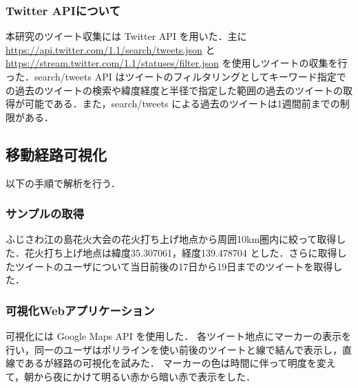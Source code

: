 \subsubsection{Twitter APIについて}
本研究のツイート収集には Twitter API を用いた．主に \url{https://api.twitter.com/1.1/search/tweets.json} と \url{https://stream.twitter.com/1.1/statuses/filter.json} を使用しツイートの収集を行った．search/tweets API はツイートのフィルタリングとしてキーワード指定での過去のツイートの検索や緯度経度と半径で指定した範囲の過去のツイートの取得が可能である．また，search/tweets による過去のツイートは1週間前までの制限がある．

\subsection{移動経路可視化}
以下の手順で解析を行う．

\subsubsection{サンプルの取得}
ふじさわ江の島花火大会の花火打ち上げ地点から周囲10km圏内に絞って取得した．花火打ち上げ地点は緯度35.307061，経度139.478704 とした．さらに取得したツイートのユーザについて当日前後の17日から19日までのツイートを取得した．


\subsubsection{可視化Webアプリケーション}
可視化には Google Maps API \cite{webpage_googlemapapi} を使用した．
各ツイート地点にマーカーの表示を行い，同一のユーザはポリラインを使い前後のツイートと線で結んで表示し，直線であるが経路の可視化を試みた．
マーカーの色は時間に伴って明度を変えて，朝から夜にかけて明るい赤から暗い赤で表示をした．



